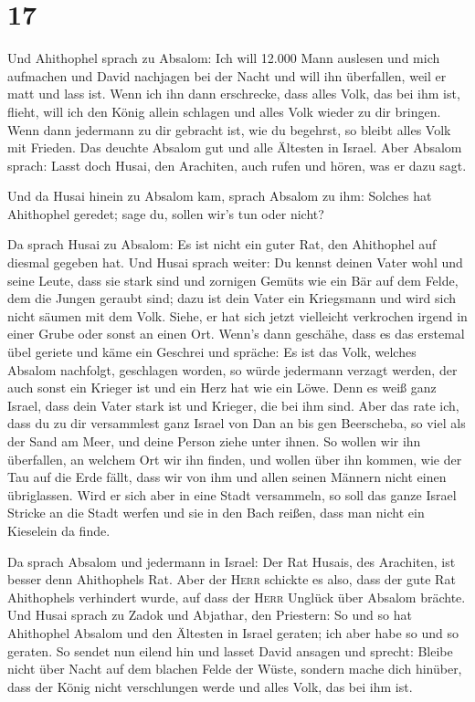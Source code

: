 \hypertarget{section-16}{%
\section{17}\label{section-16}}

 Und Ahithophel sprach zu Absalom: Ich will 12.000 Mann
auslesen und mich aufmachen und David nachjagen bei der Nacht
 und will ihn überfallen, weil er matt und lass ist. Wenn
ich ihn dann erschrecke, dass alles Volk, das bei ihm ist, flieht, will
ich den König allein schlagen  und alles Volk wieder zu
dir bringen. Wenn dann jedermann zu dir gebracht ist, wie du begehrst,
so bleibt alles Volk mit Frieden.  Das deuchte Absalom gut
und alle Ältesten in Israel.  Aber Absalom sprach: Lasst
doch Husai, den Arachiten, auch rufen und hören, was er dazu sagt.

 Und da Husai hinein zu Absalom kam, sprach Absalom zu
ihm: Solches hat Ahithophel geredet; sage du, sollen wir's tun oder
nicht?

 Da sprach Husai zu Absalom: Es ist nicht ein guter Rat,
den Ahithophel auf diesmal gegeben hat.  Und Husai sprach
weiter: Du kennst deinen Vater wohl und seine Leute, dass sie stark sind
und zornigen Gemüts wie ein Bär auf dem Felde, dem die Jungen geraubt
sind; dazu ist dein Vater ein Kriegsmann und wird sich nicht säumen mit
dem Volk.  Siehe, er hat sich jetzt vielleicht verkrochen
irgend in einer Grube oder sonst an einen Ort. Wenn's dann geschähe,
dass es das erstemal übel geriete und käme ein Geschrei und spräche: Es
ist das Volk, welches Absalom nachfolgt, geschlagen worden,
 so würde jedermann verzagt werden, der auch sonst ein
Krieger ist und ein Herz hat wie ein Löwe. Denn es weiß ganz Israel,
dass dein Vater stark ist und Krieger, die bei ihm sind. 
Aber das rate ich, dass du zu dir versammlest ganz Israel von Dan an bis
gen Beerscheba, so viel als der Sand am Meer, und deine Person ziehe
unter ihnen.  So wollen wir ihn überfallen, an welchem
Ort wir ihn finden, und wollen über ihn kommen, wie der Tau auf die Erde
fällt, dass wir von ihm und allen seinen Männern nicht einen
übriglassen.  Wird er sich aber in eine Stadt versammeln,
so soll das ganze Israel Stricke an die Stadt werfen und sie in den Bach
reißen, dass man nicht ein Kieselein da finde.

 Da sprach Absalom und jedermann in Israel: Der Rat
Husais, des Arachiten, ist besser denn Ahithophels Rat. Aber der
\textsc{Herr} schickte es also, dass der gute Rat Ahithophels verhindert
wurde, auf dass der \textsc{Herr} Unglück über Absalom brächte.
 Und Husai sprach zu Zadok und Abjathar, den Priestern:
So und so hat Ahithophel Absalom und den Ältesten in Israel geraten; ich
aber habe so und so geraten.  So sendet nun eilend hin
und lasset David ansagen und sprecht: Bleibe nicht über Nacht auf dem
blachen Felde der Wüste, sondern mache dich hinüber, dass der König
nicht verschlungen werde und alles Volk, das bei ihm ist.

